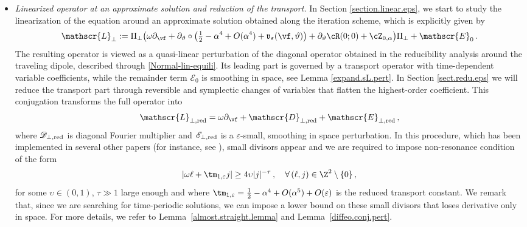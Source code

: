 \documentclass[a4paper,reqno,10pt]{article}
\newcommand{\pa}{\partial}
\newcommand{\sL}{\mathscr{L}}
\newcommand{\sE}{\mathscr{E}}
\newcommand{\sD}{\mathscr{D}}
\newcommand{\fv}{\mathfrak{v}}
\begin{document}
\begin{itemize}
    \item [(i)] {\it Linearized operator at an approximate solution and reduction of the transport.}
    In Section \ref{section.linear.eps}, we start to study the  linearization of the equation around an approximate solution obtained along the iteration scheme, which is explicitly given by
    \begin{equation}\label{linear.pert.intro}
         \sL_{\perp} := \Pi_{\perp} \big( \omega\pa_{\vf} + \pa_{\vartheta}\circ\big(\tfrac12 - \alpha^4 +O(\alpha^4) + \fv_{\varepsilon}(\vf,\vartheta )  \big) + \pa_{\vartheta} \cR(0;0) + \cZ_{0,\alpha} \big)  \Pi_{\perp} +\sE_{0}  \,.
    \end{equation}
    The resulting operator is viewed as a quasi-linear perturbation of the diagonal operator obtained in the reducibility analysis around the traveling dipole, described through \eqref{Normal-lin-equili}. Its leading part is governed by a transport operator with time-dependent variable coefficients, while the remainder term $\sE_{0}$ is smoothing in space, see Lemma \ref{expand.sL.pert}. In Section \ref{sect.redu.eps} we will reduce the transport part through reversible and symplectic changes of variables that flatten the highest-order coefficient. This conjugation transforms the full operator into 
    \begin{equation}\label{linear.pertredu.intro}
        \sL_{\perp,{\rm red}} = \omega\pa_{\vf} + \sD_{\perp,{\rm red}} + \sE_{\perp,{\rm red}}\,,
    \end{equation}
     where $\sD_{\perp,{\rm red}}$  is  diagonal Fourier multiplier and $\sE_{\perp,{\rm red}}$ is a $\varepsilon$-small, smoothing in space perturbation. In this procedure, which has been implemented in several other papers (for instance, see \cite{FMT25,HR21}), small divisors appear and we are required to impose non-resonance condition of the form
    \begin{equation}
        |\omega\ell + \tm_{1,\varepsilon} j| \geq 4\upsilon |j|^{-\tau} \,, \quad \forall \, (\ell,j) \in \Z^2\setminus\{0\} \,,
    \end{equation}
    for some $\upsilon\in (0,1)$, $\tau\gg1$ large enough and where $\tm_{1,\varepsilon} = \tfrac12 -\alpha^4 + O(\alpha^5) + O(\varepsilon)$ is the reduced transport constant. We remark that, since we are searching for time-periodic solutions, we can impose a lower bound on these small divisors that loses derivative only in space.
    For more details, we refer to Lemma~\ref{almost.straight.lemma} and Lemma~\ref{diffeo.conj.pert}.

\end{itemize}
\end{document}

